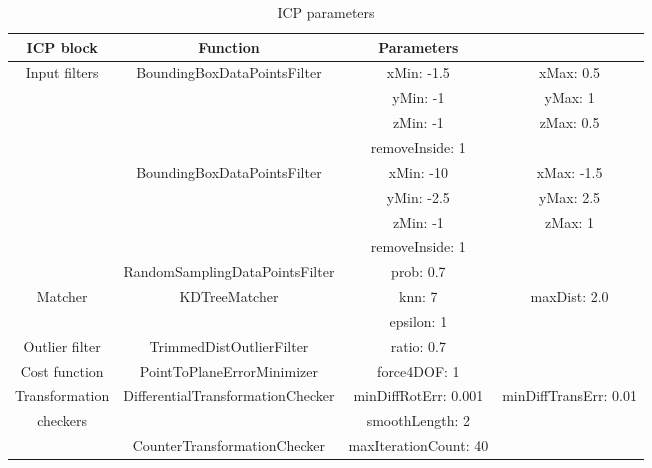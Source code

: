 \begin{table}[htpb]
	\caption{\ac{ICP} parameters}
	\begin{center}
		\begin{tabular}{c c c c} \toprule
			ICP block      & Function                          & Parameters            &                       \\
			\midrule
			Input filters  & BoundingBoxDataPointsFilter       & xMin: -1.5            & xMax: 0.5             \\
			               &                                   & yMin: -1              & yMax: 1               \\
			               &                                   & zMin: -1              & zMax: 0.5             \\
			               &                                   & removeInside: 1                               \\
			               & BoundingBoxDataPointsFilter       & xMin: -10             & xMax: -1.5            \\
			               &                                   & yMin: -2.5            & yMax: 2.5             \\
			               &                                   & zMin: -1              & zMax: 1               \\
			               &                                   & removeInside: 1                               \\
			               & RandomSamplingDataPointsFilter    & prob: 0.7             &                       \\
			\midrule
			Matcher        & KDTreeMatcher                     & knn: 7                & maxDist: 2.0          \\
			               &                                   & epsilon: 1                                    \\
			\midrule
			Outlier filter & TrimmedDistOutlierFilter          & ratio: 0.7            &                       \\
			\midrule
			Cost function  & PointToPlaneErrorMinimizer        & force4DOF: 1          &                       \\
			\midrule
			Transformation & DifferentialTransformationChecker & minDiffRotErr: 0.001  & minDiffTransErr: 0.01 \\
			checkers       &                                   & smoothLength: 2                               \\
			               & CounterTransformationChecker      & maxIterationCount: 40                         \\
			\bottomrule
		\end{tabular}
	\end{center}
	\label{tab:icp_params}
\end{table}

